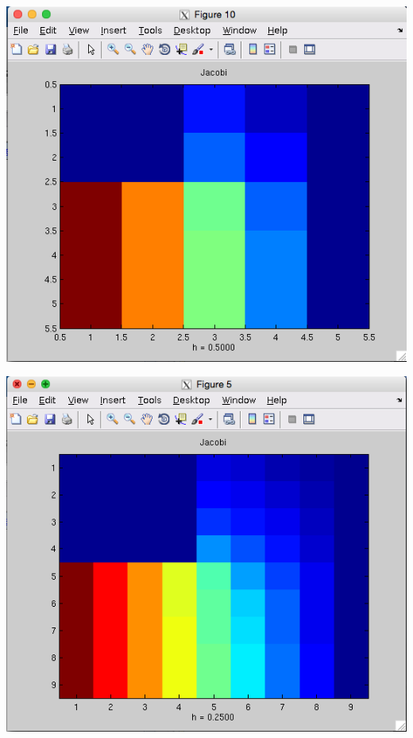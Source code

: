 \documentclass[11pt, oneside]{article}   	%
\begin{document}
\centerline{\includegraphics[scale = 0.55]{Jacobi_h1.png}}

\centerline{\includegraphics[scale = 0.55]{Jacobi_h2.png}}
\end{document}
